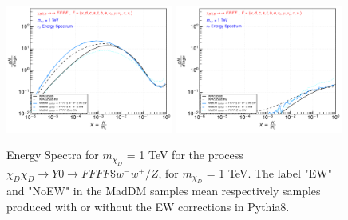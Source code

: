 \documentclass[epj,nopacs,fleqn]{svjour}
\begin{document}
\begin{figure}[!b]
\subfigure
{ \includegraphics[width=0.49\textwidth]{Fig/xdxd_FFFF_WZ/1_neutrinos_mu_FFFF_1.pdf}}
\subfigure
{ \includegraphics[width=0.49\textwidth]{Fig/xdxd_FFFF_WZ/1_neutrinos_tau_FFFF_1.pdf}}
\caption{Energy Spectra for $m_{\chi_D}$ = 1 TeV for the process $\chi_D \chi_D \rightarrow Y0 \rightarrow FFFF \$w^- w^+ /Z $, for $m_{\chi_D}$ = 1 TeV. The label "EW" and "NoEW" in the MadDM samples mean respectively samples produced with or without the EW corrections in Pythia8.}
\label{woff_1}
\end{figure}


\clearpage
\end{document}
